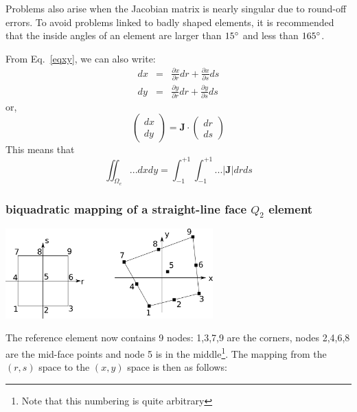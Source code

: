\begin{remark}
Problems also arise when the Jacobian matrix is nearly singular due to round-off errors.
To avoid problems linked to badly shaped elements, it is recommended that the inside
angles of an element are larger than $15\degree$ and less than $165\degree$.
\end{remark}

From Eq.~\ref{eqxy}, we can also write:
\begin{eqnarray}
dx &=& \frac{\partial x}{\partial r} dr + \frac{\partial x}{\partial s} ds \\
dy &=& \frac{\partial y}{\partial r} dr + \frac{\partial y}{\partial s} ds 
\end{eqnarray}
or, 
\begin{equation}
\left(
\begin{array}{c}
dx \\ dy
\end{array}
\right)
={\bm J}\cdot
\left(
\begin{array}{c}
dr \\ ds
\end{array}
\right)
\end{equation}
This means that 
\begin{equation}
\iint_{\Omega_e} ... dx dy = \int_{-1}^{+1} \int_{-1}^{+1} ...|{\bm J}| dr ds
\end{equation}


\subsubsection{biquadratic mapping of a straight-line face $Q_2$ element }

\begin{center}
\includegraphics[width=8cm]{images/mappings/biquadratic/mapping1}
\end{center}

The reference element now contains 9 nodes: 1,3,7,9 are the corners, nodes
2,4,6,8 are the mid-face points and node 5 is in the middle\footnote{Note that 
this numbering is quite arbitrary}.
The mapping from the $(r,s)$ space to the $(x,y)$ space is then as follows:

